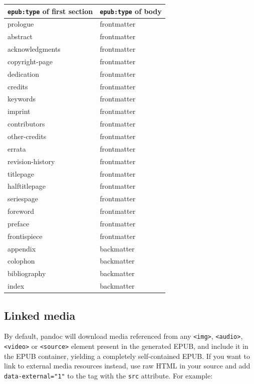 \documentclass[
]{article}
\begin{document}
\begin{longtable}[]{@{}ll@{}}
\toprule\noalign{}
\texttt{epub:type} of first section & \texttt{epub:type} of body \\
\midrule\noalign{}
\endhead
\bottomrule\noalign{}
\endlastfoot
prologue & frontmatter \\
abstract & frontmatter \\
acknowledgments & frontmatter \\
copyright-page & frontmatter \\
dedication & frontmatter \\
credits & frontmatter \\
keywords & frontmatter \\
imprint & frontmatter \\
contributors & frontmatter \\
other-credits & frontmatter \\
errata & frontmatter \\
revision-history & frontmatter \\
titlepage & frontmatter \\
halftitlepage & frontmatter \\
seriespage & frontmatter \\
foreword & frontmatter \\
preface & frontmatter \\
frontispiece & frontmatter \\
appendix & backmatter \\
colophon & backmatter \\
bibliography & backmatter \\
index & backmatter \\
\end{longtable}

\hypertarget{linked-media}{%
\subsection{Linked media}\label{linked-media}}

By default, pandoc will download media referenced from any
\texttt{\textless{}img\textgreater{}},
\texttt{\textless{}audio\textgreater{}},
\texttt{\textless{}video\textgreater{}} or
\texttt{\textless{}source\textgreater{}} element present in the
generated EPUB, and include it in the EPUB container, yielding a
completely self-contained EPUB. If you want to link to external media
resources instead, use raw HTML in your source and add
\texttt{data-external="1"} to the tag with the \texttt{src} attribute.
For example:
\end{document}
